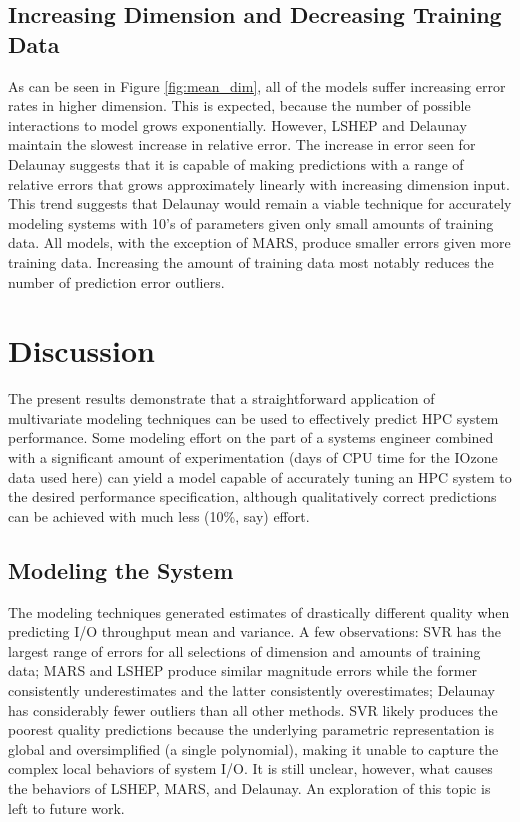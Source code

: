 \documentclass{scspaperproc}
\theoremstyle{scsthe}
\begin{document}
\vspace{-10pt}
\subsection{Increasing Dimension and Decreasing Training Data}
\vspace{-10pt}
As can be seen in Figure \ref{fig:mean_dim}, all of the models suffer
increasing error rates in higher dimension. This is expected, because
the number of possible interactions to model grows
exponentially. However, LSHEP and Delaunay maintain the slowest
increase in relative error. The increase in error seen for Delaunay
suggests that it is capable of making predictions with a range of
relative errors that grows approximately linearly with increasing
dimension input. This trend suggests that Delaunay would remain a
viable technique for accurately modeling systems with 10's of
parameters given only small amounts of training data. All models, with
the exception of MARS, produce smaller errors given more training
data. Increasing the amount of training data most notably reduces the
number of prediction error outliers.

\section{Discussion}
\label{sec:discussion}

The present results demonstrate that a straightforward application of
multivariate modeling techniques can be used to effectively predict
HPC system performance. Some modeling effort on the part of a systems
engineer combined with a significant amount of experimentation (days
of CPU time for the IOzone data used here) can yield a model capable
of accurately tuning an HPC system to the desired performance
specification, although qualitatively correct predictions can be
achieved with much less (10\%, say) effort.

\vspace{-10pt}
\subsection{Modeling the System}
\vspace{-10pt}
The modeling techniques generated estimates of drastically different
quality when predicting I/O throughput mean and variance. A few
observations: SVR has the largest range of errors for all selections
of dimension and amounts of training data; MARS and LSHEP produce
similar magnitude errors while the former consistently underestimates
and the latter consistently overestimates; Delaunay has considerably
fewer outliers than all other methods. SVR likely produces the poorest
quality predictions because the underlying parametric representation
is global and oversimplified (a single polynomial), making it unable
to capture the complex local behaviors of system I/O. It is still
unclear, however, what causes the behaviors of LSHEP, MARS, and
Delaunay. An exploration of this topic is left to future work.
\end{document}

